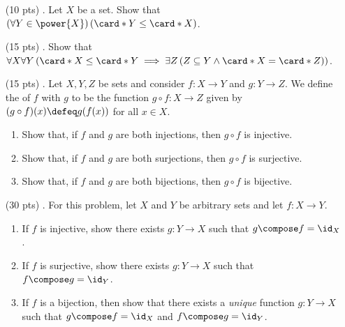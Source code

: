 \begin{enumerate}
  \item[(10 pts) \quad 1.]
    Let $X$ be a set.
    Show that $\left(\forall Y \in \power{X}\right)\left(\card*{Y} \leq \card*{X}\right)$.

  \item[(15 pts) \quad 2.]
    Show that $\forall X \forall Y \left(\card*{X} \leq  \card*{Y} \implies \exists Z \left(Z \subseteq Y \land \card*{X} = \card*{Z}\right)\right)$.

  \item[(15 pts) \quad 3.]
    Let $X, Y, Z$ be sets and consider
    $f: X \to Y$ and $g: Y \to Z$.%
    We define the  of $f$ with $g$ to be the function
    $g \circ f: X \to Z$ given by
    $(g \circ f)(x) \defeq g(f(x))$
    for all $x \in X$.
    \begin{enumerate}
      \item
        Show that, if $f$ and $g$ are both injections, then $g \circ f$ is injective.%
      \item
        Show that, if $f$ and $g$ are both surjections, then $g \circ f$ is surjective.%
      \item
        Show that, if $f$ and $g$ are both bijections, then $g \circ f$ is bijective.
    \end{enumerate}

  \item[(30 pts) \quad 4.]
    For this problem, let $X$ and $Y$ be arbitrary sets and let $f: X \to Y$.
    \begin{enumerate}
      \item
        If $f$ is injective, show there exists $g: Y \to X$ such that $g \compose f = \id_X$.
      \item
        If $f$ is surjective, show there exists $g: Y \to X$ such that $f \compose g = \id_Y$.
      \item
        If $f$ is a bijection, then show that there exists a \emph{unique} function $g: Y \to X$ such that $g \compose f = \id_X$ and $f \compose g = \id_Y$.
    \end{enumerate}


\end{enumerate}
